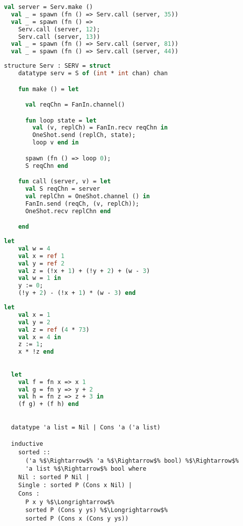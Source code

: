 \begin{lstlisting}[language=ML, style=codestyle1]
  val server = Serv.make ()
  val _ = spawn (fn () => Serv.call (server, 35))
  val _ = spawn (fn () => 
    Serv.call (server, 12); 
    Serv.call (server, 13))
  val _ = spawn (fn () => Serv.call (server, 81))
  val _ = spawn (fn () => Serv.call (server, 44))
  \end{lstlisting}

\begin{lstlisting}[language=ML, style=codestyle1]
  structure Serv : SERV = struct 
    datatype serv = S of (int * int chan) chan 

    fun make () = let 

      val reqChn = FanIn.channel()

      fun loop state = let
        val (v, replCh) = FanIn.recv reqChn in 
        OneShot.send (replCh, state);
        loop v end in

      spawn (fn () => loop 0);
      S reqChn end 

    fun call (server, v) = let 
      val S reqChn = server
      val replChn = OneShot.channel () in 
      FanIn.send (reqCh, (v, replCh));
      OneShot.recv replChn end

    end
  \end{lstlisting}

\begin{lstlisting}[language=ML, style=codestyle1]
  let
    val w = 4
    val x = ref 1
    val y = ref 2
    val z = (!x + 1) + (!y + 2) + (w - 3)
    val w = 1 in
    y := 0;
    (!y + 2) - (!x + 1) * (w - 3) end
  \end{lstlisting}

\begin{lstlisting}[language=ML, style=codestyle1]
  let 
    val x = 1  
    val y = 2
    val z = ref (4 * 73)
    val x = 4 in 
    z := 1; 
    x * !z end
  \end{lstlisting}

\begin{lstlisting}[language=ML, style=codestyle1]

  let 
    val f = fn x => x 1
    val g = fn y => y + 2
    val h = fn z => z + 3 in 
    (f g) + (f h) end

\end{lstlisting}


\begin{lstlisting}[style=codestyle1, escapechar=\%]

  datatype 'a list = Nil | Cons 'a ('a list)

  inductive
    sorted ::
      ('a %$\Rightarrow$% 'a %$\Rightarrow$% bool) %$\Rightarrow$%
      'a list %$\Rightarrow$% bool where
    Nil : sorted P Nil |
    Single : sorted P (Cons x Nil) |
    Cons :
      P x y %$\Longrightarrow$%
      sorted P (Cons y ys) %$\Longrightarrow$%
      sorted P (Cons x (Cons y ys))
  \end{lstlisting}


